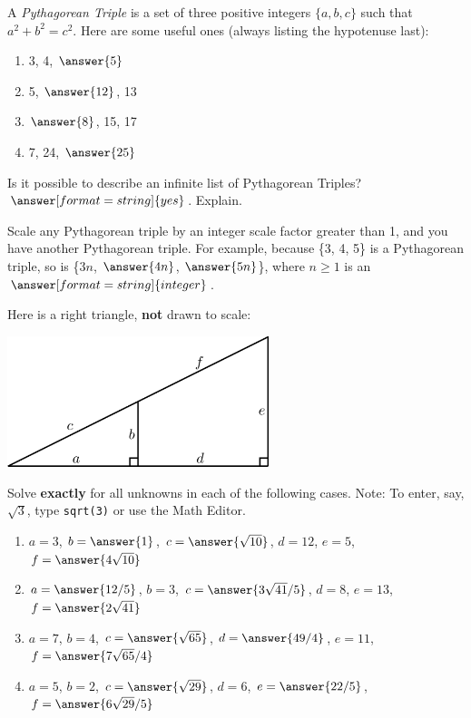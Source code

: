 \documentclass[nooutcomes]{ximera}
\begin{document}
\begin{question}
A \textit{Pythagorean Triple} is a set
  of three positive integers $\{a,b,c\}$ such that $a^2 + b^2 =
  c^2$. Here are some useful ones (always listing the hypotenuse last): 
\begin{enumerate}
\item 3, 4, $\answer{5}$
\item 5, $\answer{12}$, 13
\item $\answer{8}$, 15, 17
\item 7, 24, $\answer{25}$
\end{enumerate}
  Is it possible to describe an infinite list of Pythagorean Triples?  
  $\answer[format=string]{yes}$. 
  Explain. 
\begin{question}
Scale any Pythagorean triple by an integer scale factor greater than 1, and you have another Pythagorean triple.  For example, because \{3, 4, 5\} is a Pythagorean triple, so is \{$3n$, $\answer{4n}$, $\answer{5n}$\}, where $n \ge 1$ is an $\answer[format=string]{integer}$.  
\end{question}
\end{question}

\begin{question}
Here is a right triangle, \textbf{not} drawn to scale:
\begin{image}
\includegraphics[width=3in]{origamiSimQ.png}
\end{image}
Solve \textbf{exactly} for all unknowns in each of the following cases.  Note:  To enter, 
say, $\sqrt{3}$, type \texttt{sqrt(3)} or use the Math Editor. 
\begin{enumerate}
\item $a = 3$, $b = \answer{1}$, $c = \answer{\sqrt{10}}$, $d = 12$, $e = 5$, $f = \answer{4 \sqrt{10}}$
\item $a = \answer{12/5}$, $b = 3$, $c = \answer{3\sqrt{41}/5}$, $d =8$, $e = 13$, $f = \answer{2\sqrt{41}}$
\item $a = 7$, $b = 4$, $c = \answer{\sqrt{65}}$, $d =\answer{49/4}$, $e = 11$, $f = \answer{7\sqrt{65}/4}$
\item $a = 5$, $b = 2$, $c = \answer{\sqrt{29}}$, $d =6$, $e = \answer{22/5}$, $f = \answer{6\sqrt{29}/5}$
\end{enumerate}
\end{question}
\end{document}
